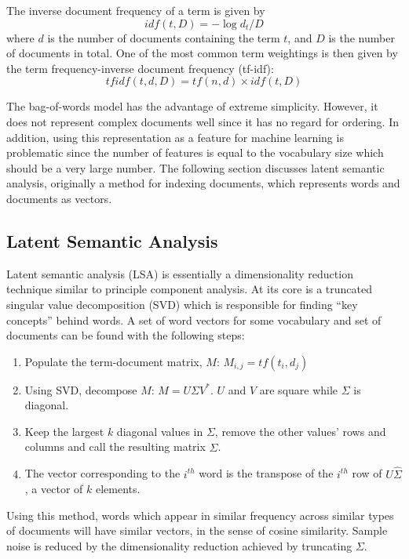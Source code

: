 The inverse document frequency of a term is given by
\begin{equation}
idf(t,D) = -\log d_t/D
\end{equation}
where $d$ is the number of documents containing the term $t$, and $D$ is the number of documents in total.  One of the most common term weightings is then given by the term frequency-inverse document frequency (tf-idf):
\begin{equation}
tfidf(t,d,D) = tf(n,d) \times idf(t,D)
\end{equation}

The bag-of-words model has the advantage of extreme simplicity.  However, it does not represent complex documents well since it has no regard for ordering.  In addition, using this representation as a feature for machine learning is problematic since the number of features is equal to the vocabulary size which should be a very large number.  The following section discusses latent semantic analysis, originally a method for indexing documents, which represents words and documents as vectors.

\subsection{Latent Semantic Analysis}
Latent semantic analysis (LSA) is essentially a dimensionality reduction technique similar to principle component analysis.  At its core is a truncated singular value decomposition (SVD) which is responsible for finding ``key concepts'' behind words.  A set of word vectors for some vocabulary and set of documents can be found with the following steps:

\begin{enumerate}
\item Populate the term-document matrix, $M$: $M_{i,j} = tf(t_i,d_j)$
\item Using SVD, decompose $M$: $M = U\Sigma V^*$.  $U$ and $V$ are square while $\Sigma$ is diagonal.
\item Keep the largest $k$ diagonal values in $\Sigma$, remove the other values' rows and columns and call the resulting matrix $\hat{\Sigma}$.
\item The vector corresponding to the $i^{th}$ word is the transpose of the $i^{th}$ row of $U\hat{\Sigma}$, a vector of $k$ elements.
\end{enumerate}
\noindent
Using this method, words which appear in similar frequency across similar types of documents will have similar vectors, in the sense of cosine similarity.  Sample noise is reduced by the dimensionality reduction achieved by truncating $\Sigma$.

